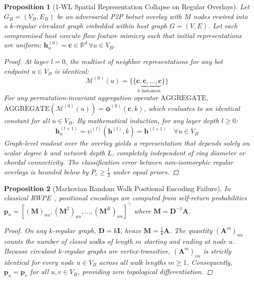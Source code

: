 \documentclass[10pt,twocolumn,letterpaper]{article}
\newtheorem{proposition}{Proposition}
\begin{document}
\begin{proposition}[1-WL Spatial Representation Collapse on Regular Overlays]
\label{prop:collapse}
Let $G_B = (V_B, E_B)$ be an adversarial P2P botnet overlay with $M$ nodes rewired into a $k$-regular circulant graph embedded within host graph $G = (V, E)$. Let each compromised host execute flow feature mimicry such that initial representations are uniform: $\mathbf{h}_u^{(0)} = \mathbf{c} \in \mathbb{R}^d \, \forall u \in V_B$.
\begin{proof}
At layer $l=0$, the multiset of neighbor representations for any bot endpoint $u \in V_B$ is identical:
\begin{equation}
\mathcal{M}^{(0)}(u) = \{\!\{ \underbrace{\mathbf{c}, \mathbf{c}, \dots, \mathbf{c}}_{k \text{ instances}} \}\!\}
\end{equation}
For any permutation-invariant aggregation operator $\mathrm{AGGREGATE}$, $\mathrm{AGGREGATE}(\mathcal{M}^{(0)}(u)) = \boldsymbol{\phi}^{(0)}(\mathbf{c}, k)$, which evaluates to an identical constant for all $u \in V_B$. By mathematical induction, for any layer depth $l \ge 0$:
\begin{equation}
\mathbf{h}_u^{(l+1)} = \psi^{(l)}\left(\mathbf{h}^{(l)}, k\right) = \mathbf{h}^{(l+1)} \quad \forall u \in V_B
\end{equation}
Graph-level readout over the overlay yields a representation that depends solely on scalar degree $k$ and network depth $L$, completely independent of ring diameter or chordal connectivity. The classification error between non-isomorphic regular overlays is bounded below by $P_e \ge \frac{1}{2}$ under equal priors.
\end{proof}
\end{proposition}

\begin{proposition}[Markovian Random Walk Positional Encoding Failure]
\label{prop:rwpe}
In classical RWPE~\cite{dwivedi2023benchmarking}, positional encodings are computed from self-return probabilities $\mathbf{p}_u = [(\mathbf{M})_{uu}, (\mathbf{M}^2)_{uu}, \dots, (\mathbf{M}^K)_{uu}]^\top$ where $\mathbf{M} = \mathbf{D}^{-1}\mathbf{A}$.
\begin{proof}
On any $k$-regular graph, $\mathbf{D} = k\mathbf{I}$, hence $\mathbf{M} = \frac{1}{k}\mathbf{A}$. The quantity $(\mathbf{A}^m)_{uu}$ counts the number of closed walks of length $m$ starting and ending at node $u$. Because circulant $k$-regular graphs are vertex-transitive, $(\mathbf{A}^m)_{uu}$ is strictly identical for every node $u \in V_B$ across all walk lengths $m \ge 1$. Consequently, $\mathbf{p}_u = \mathbf{p}_v$ for all $u, v \in V_B$, providing zero topological differentiation.
\end{proof}
\end{proposition}
\end{document}
